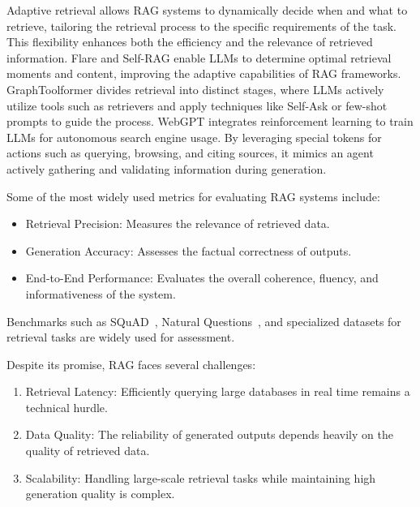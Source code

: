 \begin{enumerate}
{	      Adaptive retrieval allows RAG systems to dynamically decide when and what to retrieve, tailoring the retrieval process to the specific requirements of the task. This flexibility enhances both the efficiency and the relevance of retrieved information.
	      Flare \cite{asai2023selfrag} and Self-RAG \cite{cheng2023lift} enable LLMs to determine optimal retrieval moments and content, improving the adaptive capabilities of RAG frameworks.
	      GraphToolformer \cite{li2023chain} divides retrieval into distinct stages, where LLMs actively utilize tools such as retrievers and apply techniques like Self-Ask or few-shot prompts to guide the process.
	      WebGPT \cite{nakano2021webgpt} integrates reinforcement learning to train LLMs for autonomous search engine usage. By leveraging special tokens for actions such as querying, browsing, and citing sources, it mimics an agent actively gathering and validating information during generation.
	      }

\end{enumerate}

Some of the most widely used metrics for evaluating RAG systems include:

\begin{itemize}

	\item Retrieval Precision: Measures the relevance of retrieved data.

	\item Generation Accuracy: Assesses the factual correctness of outputs.

	\item End-to-End Performance: Evaluates the overall coherence, fluency, and informativeness of the system.

\end{itemize}

Benchmarks such as SQuAD~\cite{rajpurkar2016squad100000questionsmachine}, Natural Questions~\cite{kwiatkowski-etal-2019-natural}, and specialized datasets for retrieval tasks are widely used for assessment.

\noindent Despite its promise, RAG faces several challenges:

\begin{enumerate}

	\item Retrieval Latency: Efficiently querying large databases in real time remains a technical hurdle.

	\item Data Quality: The reliability of generated outputs depends heavily on the quality of retrieved data.

	\item Scalability: Handling large-scale retrieval tasks while maintaining high generation quality is complex.

\end{enumerate}

